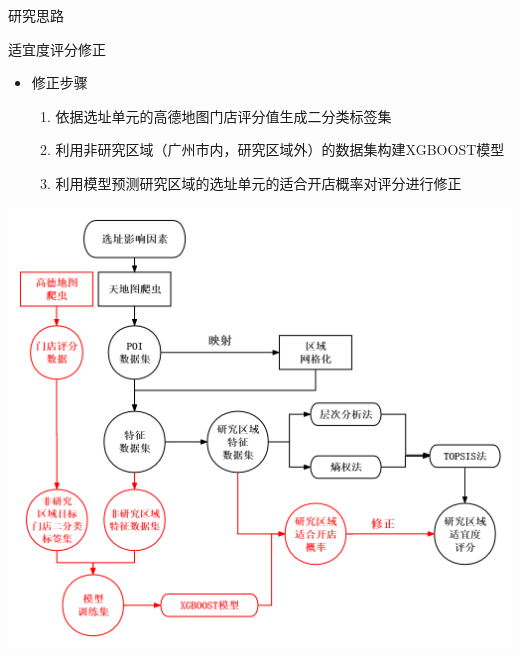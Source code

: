 \documentclass{beamer}
\begin{document}
\begin{frame}{研究思路}   
    \begin{minipage}{0.37\textwidth}
        适宜度评分修正
        \begin{itemize}
            \item 修正步骤
            \begin{enumerate}
                \item 依据选址单元的高德地图门店评分值生成二分类标签集
                \item 利用非研究区域（广州市内，研究区域外）的数据集构建XGBOOST模型
                \item 利用模型预测研究区域的选址单元的适合开店概率对评分进行修正
    
            \end{enumerate}
        \end{itemize}
  
      \end{minipage}
      \hfill
      \begin{minipage}{0.6\textwidth}
        \includegraphics[width=1\textwidth]{pic/5.png}
      \end{minipage}
\end{frame}
\end{document}
